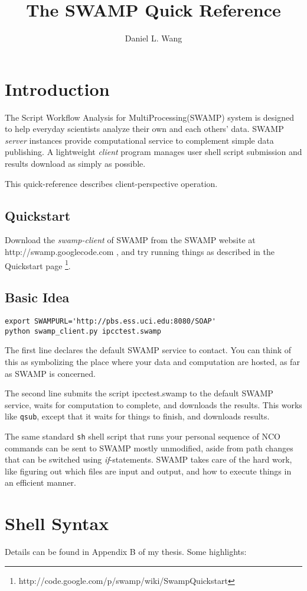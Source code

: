 \documentclass[letterpaper, twocolumn]{article}
\author{Daniel L. Wang}
\title{The SWAMP Quick Reference}
\begin{document}
\maketitle
\section{Introduction}
The Script Workflow Analysis for MultiProcessing(SWAMP) system is
designed to help everyday scientists analyze their own and each
others' data.  SWAMP \emph{server} instances provide computational
service to complement simple data publishing.  A lightweight
\emph{client} program manages user shell script submission and results
download as simply as possible.

This quick-reference describes client-perspective operation.
\subsection{Quickstart}
Download the \emph{swamp-client}  of SWAMP from the SWAMP website at
http://swamp.googlecode.com , and try running things as described in
the Quickstart page \footnote{
http://code.google.com/p/swamp/wiki/SwampQuickstart}.


\subsection{Basic Idea}
\small
\begin{verbatim}
export SWAMPURL='http://pbs.ess.uci.edu:8080/SOAP'
python swamp_client.py ipcctest.swamp 
\end{verbatim}
\normalsize
The first line declares the default SWAMP service to contact.  You can
think of this as symbolizing the place where your data and computation
are hosted, as far as SWAMP is concerned.

The second line submits the script ipcctest.swamp to the default
SWAMP service, waits for computation to complete, and downloads the
results.  This works like \texttt{qsub}, except that it waits for
things to finish, and downloads results.

The same standard \texttt{sh} shell
script that runs your personal sequence of NCO commands can be sent to
SWAMP mostly unmodified, aside from path changes that can be switched
using \emph{if}-statements.  SWAMP takes care of the hard work, like
figuring out which files are input and output, and how to execute
things in an efficient manner. 

\section{Shell Syntax}
Details can be found in Appendix B of my thesis.  Some highlights:
\end{document}
